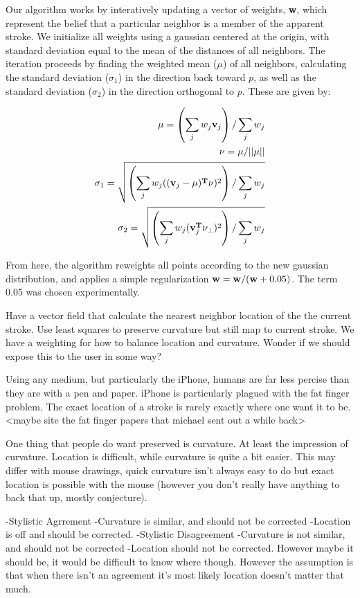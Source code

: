 Our algorithm works by interatively updating a vector of weights, {\bf w}, which represent the belief that a particular neighbor is a member of the apparent stroke.  We initialize all weights using a gaussian centered at the origin, with standard deviation equal to the mean of the distances of all neighbors. The iteration proceeds by finding the weighted mean ($\mu$) of all neighbors, calculating the standard deviation ($\sigma_1$) in the direction back toward $p$, as well as the standard deviation ($\sigma_2$) in the direction orthogonal to $p$.  These are given by:

\begin{eqnarray}
{\bf \mu} = \left(\sum_j w_j {\bf v}_j\right) / \sum_j w_j \\
{\bf \nu} = \mu/||\mu|| \\
\sigma_1 =  \sqrt{\left(\sum_j w_j (({\bf v}_j-\mu)^{\bf T}\nu)^2\right) / \sum_j w_j} \\
\sigma_2 =  \sqrt{\left(\sum_j w_j ({\bf v}_j^{\bf T}\nu_\perp)^2\right) / \sum_j w_j}
\end{eqnarray}

From here, the algorithm reweights all points according to the new gaussian distribution, and applies a simple regularization ${\bf w} = {\bf w}/ ({\bf w}+0.05)$.  The term 0.05 was chosen experimentally.


Have a vector field that calculate the nearest neighbor location of the the current stroke.
Use least squares to preserve curvature but still map to current stroke.
We have a weighting for how to balance location and curvature. Wonder if we should expose this to the user in some way?


Using any medium, but particularly the iPhone, humans are far less percise than they are with a pen and paper. iPhone is particularly plagued with the fat finger problem. The exact location of a stroke is rarely exactly where one want it to be. <maybe site the fat finger papers that michael sent out a while back> 

One thing that people do want preserved is curvature. At least the impression of curvature. Location is difficult, while curvature is quite a bit easier. This may differ with mouse drawings, quick curvature isn't always easy to do but exact location is possible with the mouse (however you don't really have anything to back that up, mostly conjecture).

-Stylistic Agrrement
	-Curvature is similar, and should not be corrected
	-Location is off and should be corrected.
-Stylistic Disagreement
	-Curvature is not similar, and should not be corrected
	-Location should not be corrected. However maybe it should be, it would be difficult to know where though. However the assumption is that when there isn't an agreement it's most likely location doesn't matter that much.

